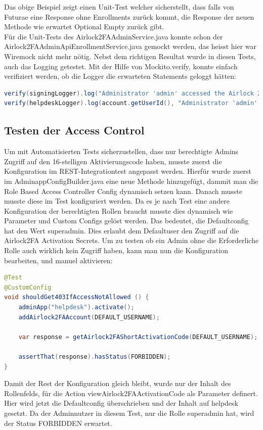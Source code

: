 Das obige Beispiel zeigt einen Unit-Test welcher sicherstellt, dass falls von Futurae eine Response ohne Enrollments zurück kommt, die Response der neuen Methode wie erwartet Optional Empty zurück gibt.\\
Für die Unit-Tests des Airlock2FAAdminService.java konnte schon der\\
Airlock2FAAdminApiEnrollmentService.java gemockt werden, das heisst hier war Wiremock nicht mehr nötig. Nebst dem richtigen Resultat wurde in diesen Tests, auch das Logging getestet. Mit der Hilfe von Mockito.verify, konnte einfach verifiziert werden, ob die Logger die erwarteten Statements geloggt hätten:
\begin{lstlisting}[language=Java]
verify(signingLogger).log("Administrator 'admin' accessed the Airlock 2FA short activation code of user 'user'.");
verify(helpdeskLogger).log(account.getUserId(), "Administrator 'admin' accessed the Airlock 2FA short activation code.");
\end{lstlisting}
\subsection{Testen der Access Control}
Um mit Automatisierten Tests sicherzustellen, dass nur berechtigte Admins Zugriff auf den 16-stelligen Aktivierungscode haben, musste zuerst die Konfiguration im REST-Integrationtest angepasst werden. Hierfür wurde zuerst im AdminappConfigBuilder.java eine neue Methode hinzugefügt, dammit man die Role Based Access Controller Config dynamisch setzen kann. Danach musste musste diese im Test konfiguriert werden. Da es je nach Test eine andere Konfiguration der berechtigten Rollen braucht musste dies dynamisch wie Parameter und Custom Configs gelöst werden. Das bedeutet, die Defaultconfig hat den Wert \flqq superadmin\frqq{}. Dies erlaubt dem Defaultuser den Zugriff auf die Airlock2FA Activation Secrets. Um zu testen ob ein Admin ohne die Erforderliche Rolle auch wirklich kein Zugriff haben, kann man nun die Konfiguration bearbeiten, und manuel aktivieren:
\begin{lstlisting}[language=Java]
@Test
@CustomConfig
void shouldGet403IfAccessNotAllowed () {
	adminApp("helpdesk").activate();
	addAirlock2FAAccount(DEFAULT_USERNAME);
	
	var response = getAirlock2FAShortActivationCode(DEFAULT_USERNAME);
	
	assertThat(response).hasStatus(FORBIDDEN);
}
\end{lstlisting}
Damit der Rest der Konfiguration gleich bleibt, wurde nur der Inhalt des Rollenfelds, für die Action \flqq viewAirlock2FAActivationCode\frqq{} als Parameter definert. Hier wird jetzt die Defaultconfig überschrieben und der Inhalt auf helpdesk gesetzt. Da der Adminnutzer in diesem Test, nur die Rolle superadmin hat, wird der Status FORBIDDEN erwartet.
